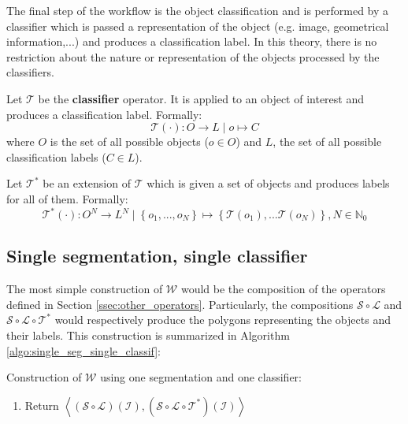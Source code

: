 The final step of the workflow is the object classification and is performed by a classifier which is passed a representation of the object (e.g. image, geometrical information,...) and produces a classification label. In this theory, there is no restriction about the nature or representation of the objects processed by the classifiers.

\begin{definition} \label{def:classif_op}
Let $\mathcal{T}$ be the \textbf{classifier} operator. It is applied to an object of interest and produces a classification label. Formally:
\begin{equation}
	\mathcal{T}(\cdot) : O \rightarrow L \mid o \mapsto C
\end{equation}
where $O$ is the set of all possible objects ($o \in O$) and $L$, the set of all possible classification labels ($C \in L$). 
\end{definition}
\begin{definition}
Let $\mathcal{T}^*$ be an extension of $\mathcal{T}$ which is given a set of objects and produces labels for all of them. Formally: 
\begin{equation}
	\mathcal{T}^*(\cdot) : O^N \rightarrow L^N \mid \left\{o_1,...,o_N\right\} \mapsto \left\{\mathcal{T}(o_1), ... \mathcal{T}(o_N)\right\}, N \in \mathbb{N}_0
\end{equation}
\end{definition}

\subsection{Single segmentation, single classifier}
\label{ssec:single_single}

The most simple construction of $\mathcal{W}$ would be the composition of the operators defined in Section \ref{ssec:other_operators}. Particularly, the compositions $\mathcal{S} \circ \mathcal{L}$ and $\mathcal{S} \circ \mathcal{L} \circ \mathcal{T}^*$ would respectively produce the polygons representing the objects and their labels. This construction is summarized in Algorithm \ref{algo:single_seg_single_classif}: 

\begin{algorithm} \label{algo:single_seg_single_classif} 
	Construction of $\mathcal{W}$ using one segmentation and one classifier:
	
	\begin{enumerate}
		\item Return $\left\langle\left(\mathcal{S} \circ \mathcal{L}\right)\left(\mathcal{I}\right) , \left(\mathcal{S} \circ \mathcal{L} \circ \mathcal{T}^*\right)\left(\mathcal{I}\right)\right\rangle$
	\end{enumerate}
\end{algorithm}

